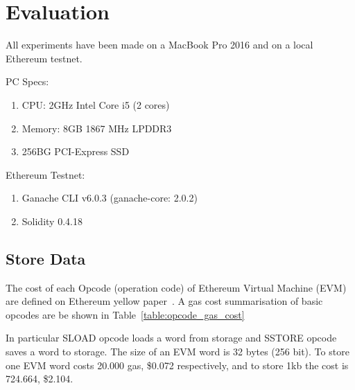 \chapter{Evaluation}
\label{evaluation}

All experiments have been made on a MacBook Pro 2016 and on a local Ethereum testnet.

PC Specs:

\begin{enumerate}
  \item CPU: 2GHz Intel Core i5 (2 cores)
  \item Memory: 8GB 1867 MHz LPDDR3
  \item 256BG PCI-Express SSD
\end{enumerate}

Ethereum Testnet:

\begin{enumerate}
  \item Ganache CLI v6.0.3 (ganache-core: 2.0.2)
  \item Solidity 0.4.18
\end{enumerate}

\section{Store Data}
\label{evaluation:store_data}

The cost of each Opcode (operation code) of Ethereum Virtual Machine (EVM) are defined on Ethereum yellow paper~\cite{ethereum_yellowpaper}. A gas cost summarisation of basic opcodes are be shown in Table~\ref{table:opcode_gas_cost}

In particular SLOAD opcode loads a word from storage and SSTORE opcode saves a word to storage. The size of an EVM word is 32 bytes (256 bit). To store one EVM word costs 20.000 gas, \$0.072 respectively, and to store 1kb the cost is 724.664, \$2.104.


